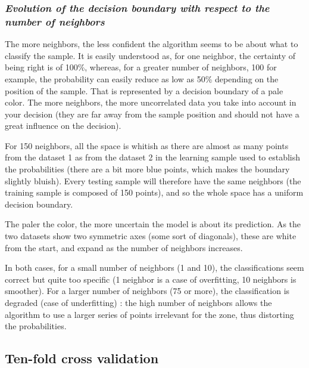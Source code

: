\subsubsection{{\it Evolution of the decision boundary with respect to the number of neighbors}}
The more neighbors, the less confident the algorithm seems to be about what to classify the sample. It is easily understood as, for one neighbor, the certainty of being \og{}right\fg{} is of \num{100}\%, whereas, for a greater number of neighbors, \num{100} for example, the probability can easily reduce as low as \num{50}\% depending on the position of the sample. That is represented by a decision boundary of a pale color. The more neighbors, the more uncorrelated data you take into account in your decision (they are far away from the sample position and should not have a great influence on the decision).\par
For \num{150} neighbors, all the space is whitish as there are almost as many points from the dataset 1 as from the dataset 2 in the learning sample used to establish the probabilities (there are a bit more blue points, which makes the boundary slightly bluish). Every testing sample will therefore have the same neighbors (the training sample is composed of 150 points), and so the whole space has a uniform decision boundary.\par
The paler the color, the more uncertain the model is about its prediction. As the two datasets show two \og{}symmetric\fg{} axes (some sort of diagonals), these are white from the start, and expand as the number of neighbors increases.\par
In both cases, for a small number of neighbors (1 and 10), the classifications seem correct but quite too specific (1 neighbor is a case of overfitting, 10 neighbors is smoother). For a larger number of neighbors (75 or more), the classification is degraded (case of underfitting) : the high number of neighbors allows the algorithm to use a larger series of points irrelevant for the zone, thus distorting the probabilities.

\subsection{Ten-fold cross validation}

